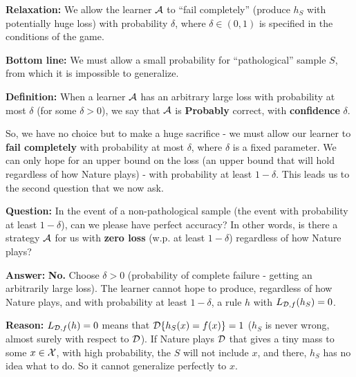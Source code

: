 {  {\bf Relaxation:} We allow the learner $\mathcal{A}$ to ``fail completely''	(produce $h_S$ with potentially huge loss) with
	probability $\delta$, where $\delta \in (0,1)$ is specified in the conditions 	of the game.
	
  {\bf Bottom line:} We must allow a small probability for
	``pathological'' sample $S$, from which it is impossible to generalize. 
	
  {\bf Definition:} When a learner $\mathcal{A}$ has  an arbitrary large loss with probability
	at most $\delta$ (for some $\delta>0$), we say that $\mathcal{A}$ is {\bf Probably}
	correct, with {\bf confidence} $\delta$.
 

So, we have no choice but to make a huge sacrifice - we must allow our learner to
{\bf fail completely} with probability at most $\delta$, where $\delta$ is a fixed parameter. 
We can only hope for an upper bound on the
loss (an upper bound that will hold regardless of how Nature plays) - with probability at least  $1-\delta$. 
This leads us to the second question that we now ask.


\textbf{Question:} In the event of a non-pathological sample (the event with probability at least $1-\delta$), can we please have perfect accuracy?  
In other words, is there a strategy $\mathcal{A}$ for us with {\bf zero loss} (w.p. at least $1-\delta$) regardless of how Nature plays?
	
\textbf{Answer:} {\bf No.} Choose $\delta>0$ (probability of complete failure - getting an
	arbitrarily large loss). The learner cannot 	hope to produce, regardless of how Nature plays, and with probability at
	least $1-\delta$, a 	rule $h$ with $L_{\mathcal{D},f}(h_S)=0$.
	
	\textbf{Reason:} $L_{\mathcal{D},f}(h)=0$ means that $\mathcal{D}\{h_S(x)= f(x)\}=1$ ($h_S$ is never wrong, almost surely with respect to $\mathcal{D}$). 	If Nature plays $\mathcal{D}$ that gives a
	tiny mass to some $x\in\mathcal{X}$, with high probability, the 	$S$ will not include $x$, and there, $h_S$ has no 	idea what to do. So it cannot generalize perfectly to $x$.
	
}
